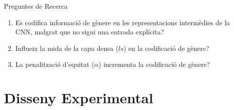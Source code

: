 \documentclass[aspectratio=169,12pt]{beamer}
\begin{document}
\begin{frame}{Preguntes de Recerca}
  \begin{enumerate}
    \setlength\itemsep{1em}
    \item[\textbf{RQ1}] Es codifica informació de gènere en les representacions intermèdies de la CNN, malgrat que no sigui una entrada explícita?

    \item[\textbf{RQ2}] Influeix la mida de la capa densa ($ls$) en la codificació de gènere?

    \item[\textbf{RQ3}] La penalització d'equitat ($\alpha$) incrementa la codificació de gènere?
  \end{enumerate}
\end{frame}

%
%
%

\section{Disseny Experimental}
\end{document}
